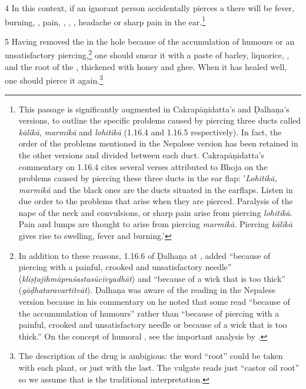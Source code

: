 \begin{translation}
    \item [4] In this context, if an ignorant person accidentally pierces a
 there will be fever, burning, , pain,
, ,
, headache or sharp pain in the ear.\footnote{This
    passage is significantly augmented in Cakrapāṇidatta's and Ḍalhaṇa's versions,
    to outline the specific problems caused by piercing three ducts called
    \emph{kālikā}, \emph{marmikā} and \emph{lohitikā} (1.16.4
    \citep[126]{acar-1939} and 1.16.5 \citep[77]{vulgate} respectively). In fact,
    the order of the problems mentioned in the Nepalese version has been retained
    in the other versions and divided between each duct. Cakrapāṇidatta's
    commentary on 1.16.4 \citep[126]{acar-1939} cites several verses attributed to
    Bhoja on the problems caused by piercing these three ducts in the ear flap:
    '\emph{Lohitikā}, \emph{marmikā} and the black ones are the ducts situated in
    the earflaps.  Listen in due order to the problems that arise when they are
    pierced. Paralysis of the nape of the neck and convulsions, or sharp pain
    arise from piercing \emph{lohitikā}. Pain and lumps are thought to arise from
    piercing \emph{marmikā}. Piercing \emph{kālikā} gives rise to swelling, fever
    and burning.'}
    
    \item[5]     Having removed the  in the hole because of the
accumulation of humours or an unsatisfactory piercing,\footnote{In addition to
    these reasons, 1.16.6 of Ḍalhaṇa at , added “because of
    piercing with a painful, crooked and unsatisfactory needle”
    (\emph{kliṣṭajihmāpraśastasūcīvyadhāt}) and  “because of a wick that is too
    thick” (\emph{gāḍhataravartitvāt}). Ḍalhaṇa was aware of the reading in the
    Nepalese version because in his commentary on  he noted that
    some read “because of the accummulation of humours” rather than “because of
    piercing with a painful, crooked and unsatisfactory needle or because of a
    wick that is too thick.” On the concept of humoral
    , see the important analysis by \citet{meul-1992}.}
    one should smear it with a paste of barley, liquorice, , and the root of the ,
    thickened with honey and ghee. When it has healed well, one should pierce it
    again.\footnote{The description of the drug is ambigious: the word “root”
        could be taken with each plant, or just with the last.  The vulgate reads just
        “castor oil root” so we assume that is the traditional interpretation.}
    

\end{translation}
